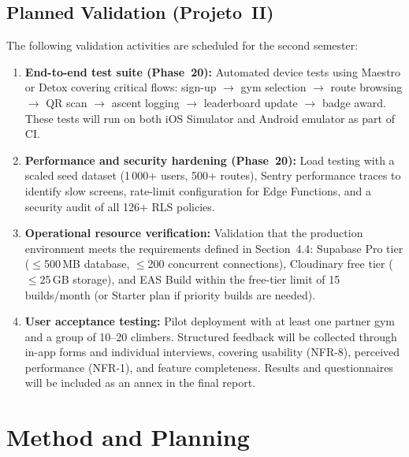 \documentclass[12pt,a4paper]{report}
\renewcommand\_{\textunderscore\hspace{0pt}}
\begin{document}
\section{Planned Validation (Projeto~II)}

The following validation activities are scheduled for the second semester:

\begin{enumerate}[noitemsep]
    \item \textbf{End-to-end test suite (Phase~20):} Automated device tests using Maestro or Detox covering critical flows: sign-up $\rightarrow$ gym selection $\rightarrow$ route browsing $\rightarrow$ QR scan $\rightarrow$ ascent logging $\rightarrow$ leaderboard update $\rightarrow$ badge award. These tests will run on both iOS Simulator and Android emulator as part of CI.

    \item \textbf{Performance and security hardening (Phase~20):} Load testing with a scaled seed dataset (1\,000+ users, 500+ routes), Sentry performance traces to identify slow screens, rate-limit configuration for Edge Functions, and a security audit of all 126+ RLS policies.

    \item \textbf{Operational resource verification:} Validation that the production environment meets the requirements defined in Section~4.4: Supabase Pro tier ($\leq$500\,MB database, $\leq$200 concurrent connections), Cloudinary free tier ($\leq$25\,GB storage), and EAS Build within the free-tier limit of 15 builds/month (or Starter plan if priority builds are needed).

    \item \textbf{User acceptance testing:} Pilot deployment with at least one partner gym and a group of 10--20 climbers. Structured feedback will be collected through in-app forms and individual interviews, covering usability (NFR-8), perceived performance (NFR-1), and feature completeness. Results and questionnaires will be included as an annex in the final report.
\end{enumerate}

\chapter{Method and Planning}
\end{document}
